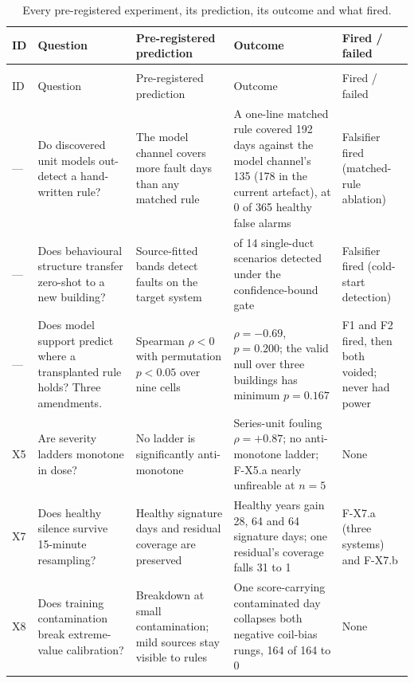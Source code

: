 \documentclass[11pt,letterpaper]{article}
\begin{document}
{\footnotesize\setlength{\tabcolsep}{3pt}\renewcommand{\arraystretch}{1.05}\setlength{\LTcapwidth}{\textwidth}
\begin{longtable}{@{}>{\raggedright\arraybackslash}p{0.9cm}>{\raggedright\arraybackslash}p{4.3cm}>{\raggedright\arraybackslash}p{3.2cm}>{\raggedright\arraybackslash}p{4.2cm}>{\raggedright\arraybackslash}p{2.4cm}@{}}
\caption{Every pre-registered experiment, its prediction, its outcome and what fired.}\label{tab:ledger}\\
\hline
ID & Question & Pre-registered prediction & Outcome & Fired / failed \\
\hline
\endfirsthead
\multicolumn{5}{@{}l}{\emph{Table~\thetable{} (continued)}}\\
\hline
ID & Question & Pre-registered prediction & Outcome & Fired / failed \\
\hline
\endhead
\hline
\endfoot
\endlastfoot
--- & Do discovered unit models out-detect a hand-written rule? & The model channel covers more fault days than any matched rule & A one-line matched rule covered 192 days against the model channel's 135 (178 in the current artefact), at 0 of 365 healthy false alarms & Falsifier fired (matched-rule ablation) \\
--- & Does behavioural structure transfer zero-shot to a new building? & Source-fitted bands detect faults on the target system & 0 of 14 single-duct scenarios detected under the confidence-bound gate & Falsifier fired (cold-start detection) \\
--- & Does model support predict where a transplanted rule holds? Three amendments. & Spearman $\rho < 0$ with permutation $p < 0.05$ over nine cells & $\rho = -0.69$, $p = 0.200$; the valid null over three buildings has minimum $p = 0.167$ & F1 and F2 fired, then both voided; never had power \\
X5 & Are severity ladders monotone in dose? & No ladder is significantly anti-monotone & Series-unit fouling $\rho = +0.87$; no anti-monotone ladder; F-X5.a nearly unfireable at $n = 5$ & None \\
X7 & Does healthy silence survive 15-minute resampling? & Healthy signature days and residual coverage are preserved & Healthy years gain 28, 64 and 64 signature days; one residual's coverage falls 31 to 1 & F-X7.a (three systems) and F-X7.b \\
X8 & Does training contamination break extreme-value calibration? & Breakdown at small contamination; mild sources stay visible to rules & One score-carrying contaminated day collapses both negative coil-bias rungs, 164 of 164 to 0 & None \\

\end{longtable}}
\end{document}
